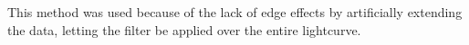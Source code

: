 This method was used because of the lack of edge effects by artificially extending the data, letting the filter be applied over the entire lightcurve.
